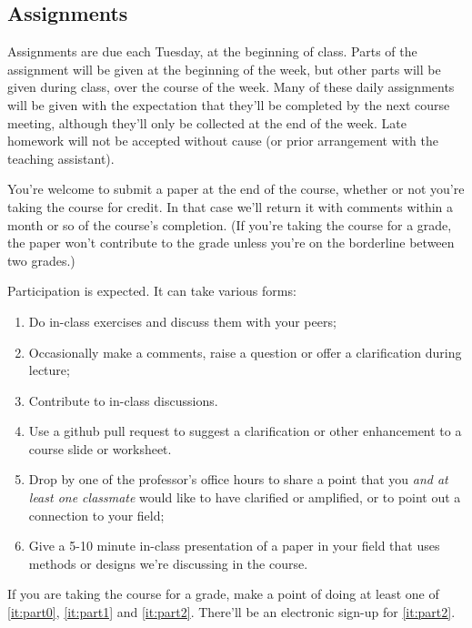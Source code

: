 \documentclass[12pt]{article}
\begin{document}
\subsection{Assignments}
Assignments are due each Tuesday, at the beginning of
class. Parts of the assignment will be given at the beginning of the
week, but other parts will be given during class, over the course of
the week.  Many of these daily assignments will be given with the
expectation that they'll be completed by the next course meeting,
although they'll only be collected at the end of the week.
Late homework will not be accepted without cause (or prior arrangement
with the teaching assistant).   

You're welcome to submit a paper at the end of the course, whether or not you're taking the course for credit.  In that case we'll return it with comments within a month or so of the course's completion.  (If you're taking the course for a grade, the paper won't contribute to the grade unless you're on  the borderline between two grades.) 

Participation is expected.  It can take various forms:
\begin{enumerate}
\item Do in-class exercises and discuss them with your peers;
\item Occasionally make a comments, raise a question or offer a clarification
  during lecture;
\item Contribute to in-class discussions.
\item \label{it:part0} Use a github pull request to suggest a clarification or other enhancement to
  a course slide or worksheet.
\item \label{it:part1} Drop by one of the professor's office hours to share a point
  that you \textit{and at least one classmate} would like to have clarified or
  amplified, or to point out a connection to your field; 
\item \label{it:part2} Give a 5-10 minute in-class presentation of a paper in your
  field that uses methods or designs we're discussing in the course.
\end{enumerate}
If you are taking the course for a grade, make a point of doing at
least one of \ref{it:part0}, \ref{it:part1} and \ref{it:part2}.  There'll be an
electronic sign-up for \ref{it:part2}.

\end{document}
